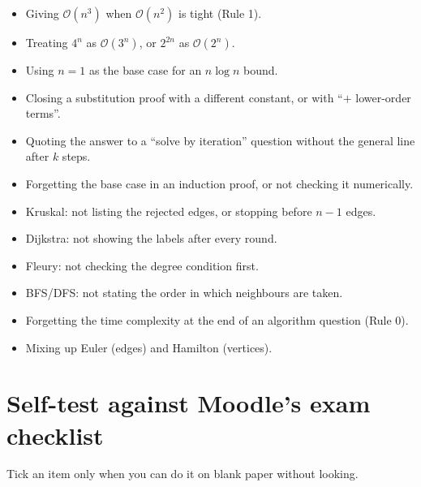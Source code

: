 \documentclass{fkt-notes}
\newcommand{\Oh}{\mathcal{O}}
\begin{document}
\begin{itemize}[leftmargin=1.5em,itemsep=2pt]
  \item Giving $\Oh(n^3)$ when $\Oh(n^2)$ is tight (Rule 1).
  \item Treating $4^n$ as $\Oh(3^n)$, or $2^{2n}$ as $\Oh(2^n)$.
  \item Using $n=1$ as the base case for an $n\log n$ bound.
  \item Closing a substitution proof with a different constant, or with ``$+$ lower-order terms''.
  \item Quoting the answer to a ``solve by iteration'' question without the general line after $k$ steps.
  \item Forgetting the base case in an induction proof, or not checking it numerically.
  \item Kruskal: not listing the rejected edges, or stopping before $n-1$ edges.
  \item Dijkstra: not showing the labels after every round.
  \item Fleury: not checking the degree condition first.
  \item BFS/DFS: not stating the order in which neighbours are taken.
  \item Forgetting the time complexity at the end of an algorithm question (Rule 0).
  \item Mixing up Euler (edges) and Hamilton (vertices).
\end{itemize}

\section{Self-test against Moodle's exam checklist}

Tick an item only when you can do it on blank paper without looking.
\end{document}
